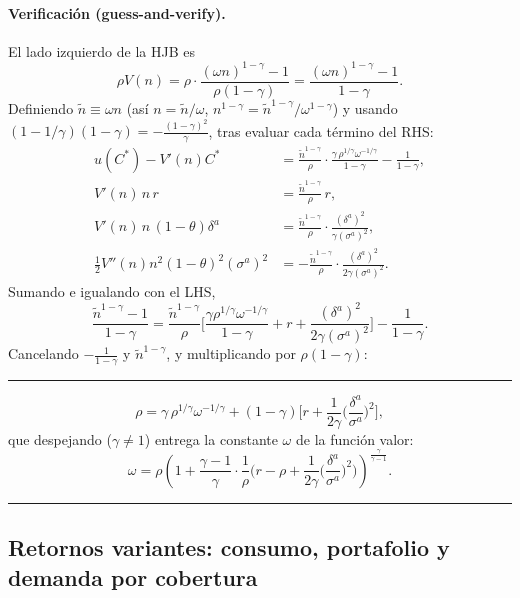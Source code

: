 \documentclass[11pt]{article}
\theoremstyle{definition}
\theoremstyle{remark}
\newenvironment{resultado}
  {\par\medskip\noindent\begin{minipage}{\linewidth}\rule{\linewidth}{0.4pt}\par\smallskip\noindent}
  {\par\smallskip\noindent\rule{\linewidth}{0.4pt}\end{minipage}\medskip\par}
\begin{document}
\paragraph{Verificación (guess-and-verify).}
El lado izquierdo de la HJB es
\[
\rho V(n)=\rho\cdot\frac{(\omega n)^{1-\gamma}-1}{\rho(1-\gamma)}=\frac{(\omega n)^{1-\gamma}-1}{1-\gamma}.
\]
Definiendo $\tilde n\equiv\omega n$ (así $n=\tilde n/\omega$, $n^{1-\gamma}=\tilde n^{1-\gamma}/\omega^{1-\gamma}$) y usando $(1-1/\gamma)(1-\gamma)=-\tfrac{(1-\gamma)^2}{\gamma}$, tras evaluar cada término del RHS:
\begin{align*}
u(C^*)-V'(n)C^* &= \frac{\tilde n^{1-\gamma}}{\rho}\cdot\frac{\gamma\,\rho^{1/\gamma}\omega^{-1/\gamma}}{1-\gamma}-\frac{1}{1-\gamma},\\
V'(n)\,n\,r &= \frac{\tilde n^{1-\gamma}}{\rho}\,r,\\
V'(n)\,n\,(1-\theta)\delta^{a} &= \frac{\tilde n^{1-\gamma}}{\rho}\cdot\frac{(\delta^{a})^2}{\gamma(\sigma^{a})^2},\\
\tfrac12 V''(n)n^2(1-\theta)^2(\sigma^{a})^2 &= -\frac{\tilde n^{1-\gamma}}{\rho}\cdot\frac{(\delta^{a})^2}{2\gamma(\sigma^{a})^2}.
\end{align*}
Sumando e igualando con el LHS,
\[
\frac{\tilde n^{1-\gamma}-1}{1-\gamma}
=\frac{\tilde n^{1-\gamma}}{\rho}\Big[\frac{\gamma\rho^{1/\gamma}\omega^{-1/\gamma}}{1-\gamma}+r+\frac{(\delta^{a})^2}{2\gamma(\sigma^{a})^2}\Big]-\frac{1}{1-\gamma}.
\]
Cancelando $-\tfrac{1}{1-\gamma}$ y $\tilde n^{1-\gamma}$, y multiplicando por $\rho(1-\gamma)$:
\begin{resultado}
\begin{equation}\label{eq:rho-omega}
\rho=\gamma\,\rho^{1/\gamma}\omega^{-1/\gamma}+(1-\gamma)\Big[r+\frac{1}{2\gamma}\Big(\frac{\delta^{a}}{\sigma^{a}}\Big)^2\Big],
\end{equation}
que despejando ($\gamma\neq 1$) entrega la constante $\omega$ de la función valor:
\begin{equation}\label{eq:omega-closed}
\omega=\rho\left(1+\frac{\gamma-1}{\gamma}\cdot\frac{1}{\rho}\Big(r-\rho+\frac{1}{2\gamma}\Big(\frac{\delta^{a}}{\sigma^{a}}\Big)^2\Big)\right)^{\!\frac{\gamma}{\gamma-1}}.
\end{equation}
\end{resultado}

\subsection{Retornos variantes: consumo, portafolio y demanda por cobertura}
\end{document}
